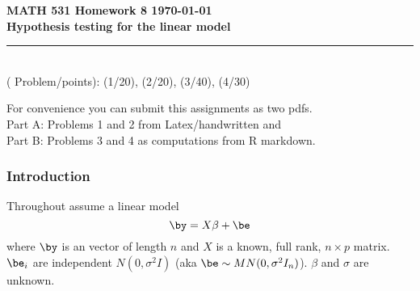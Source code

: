 \documentclass[10pt]{report}
\begin{document}
\vspace*{-1in}
\noindent
{\LARGE  \bf  \sc  MATH 531  Homework 8  \hfill  \today \\
  }
\noindent
{\Large \bf Hypothesis testing for the linear model    } 
\ \\
{\color{orange3} \hrule  }
\ \\
( Problem/points): (1/20), (2/20), (3/40), (4/30)


For convenience you can submit this assignments as two pdfs. \\
 Part A: Problems 1 and 2 from Latex/handwritten and  \\
 Part B: Problems 3 and 4  as computations from R markdown.  


 \subsubsection*{Introduction}
 Throughout assume a linear model 
\begin{equation}
 \by = X \beta + \be
\end{equation}
where $\by$ is an vector of length $n$ and $X$ is a known, full rank,
 $n\times p$ matrix. $\be_i$ are independent $N(0,\sigma^2I)$ (aka $\be \sim MN( 0, \sigma^2 I_n) $).
 $\beta$ and $\sigma$ are unknown. 
\end{document}
